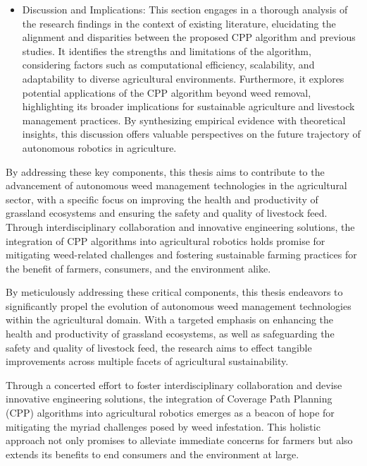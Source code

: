 \begin{itemize}
  \item Discussion and Implications: This section engages in a thorough analysis of the research findings in the context of existing literature, elucidating the alignment and disparities between the proposed CPP algorithm and previous studies. It identifies the strengths and limitations of the algorithm, considering factors such as computational efficiency, scalability, and adaptability to diverse agricultural environments. Furthermore, it explores potential applications of the CPP algorithm beyond weed removal, highlighting its broader implications for sustainable agriculture and livestock management practices. By synthesizing empirical evidence with theoretical insights, this discussion offers valuable perspectives on the future trajectory of autonomous robotics in agriculture.

\end{itemize}

\vspace*{6mm} 


By addressing these key components, this thesis aims to contribute to the advancement of autonomous weed management technologies in the agricultural sector, with a specific focus on improving the health and productivity of grassland ecosystems and ensuring the safety and quality of livestock feed. Through interdisciplinary collaboration and innovative engineering solutions, the integration of CPP algorithms into agricultural robotics holds promise for mitigating weed-related challenges and fostering sustainable farming practices for the benefit of farmers, consumers, and the environment alike.

\vspace*{6mm} 


By meticulously addressing these critical components, this thesis endeavors to significantly propel the evolution of autonomous weed management technologies within the agricultural domain. With a targeted emphasis on enhancing the health and productivity of grassland ecosystems, as well as safeguarding the safety and quality of livestock feed, the research aims to effect tangible improvements across multiple facets of agricultural sustainability.

\vspace*{6mm} 

Through a concerted effort to foster interdisciplinary collaboration and devise innovative engineering solutions, the integration of Coverage Path Planning (CPP) algorithms into agricultural robotics emerges as a beacon of hope for mitigating the myriad challenges posed by weed infestation. This holistic approach not only promises to alleviate immediate concerns for farmers but also extends its benefits to end consumers and the environment at large.

